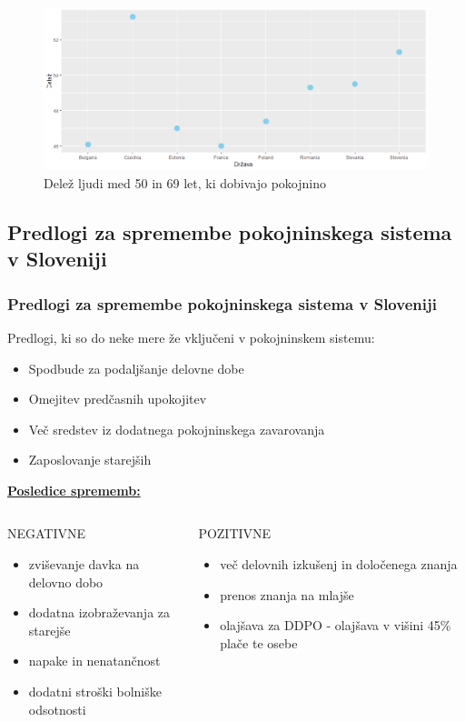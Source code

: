 \documentclass[10pt]{beamer}
\begin{document}
\begin{frame}

\begin{figure}[h!]
\centering
\includegraphics[width = 10 cm]{graf_procentualno_pokojnina.png}
\caption{Delež ljudi med 50 in 69 let, ki dobivajo pokojnino}
\label{Slika 5}
\end{figure}
\end{frame}

\begin{frame}
\subsection[Predolgi za spremembe pokojninskega sistema v Sloveniji]{Predlogi za spremembe pokojninskega sistema v Sloveniji}
\frametitle{Predlogi za spremembe pokojninskega sistema v Sloveniji}
Predlogi, ki so do neke mere že vključeni v pokojninskem sistemu:
\begin{itemize}
\item Spodbude za podaljšanje delovne dobe
\item Omejitev predčasnih upokojitev
\item Več sredstev iz dodatnega pokojninskega zavarovanja
\item Zaposlovanje starejših
\end{itemize}

\underline{ \textbf{Posledice sprememb:}}
\begin{columns}[T]
\begin{column}{0.5\textwidth}
\begin{block}{NEGATIVNE}
	\begin{itemize}
	\item zviševanje davka na delovno dobo
	\item dodatna izobraževanja za starejše
	\item napake in nenatančnost
	\item dodatni stroški bolniške odsotnosti
	\end{itemize}
\end{block}
\end{column}
\begin{column}{0.5\textwidth}  
\begin{block}{POZITIVNE}
	\begin{itemize}
	\item več delovnih izkušenj in določenega znanja
	\item prenos znanja na mlajše
	\item olajšava za DDPO - olajšava v višini 45\% plače te osebe
	\end{itemize}
\end{block}
\end{column}
\end{columns}
\end{frame}
\end{document}
